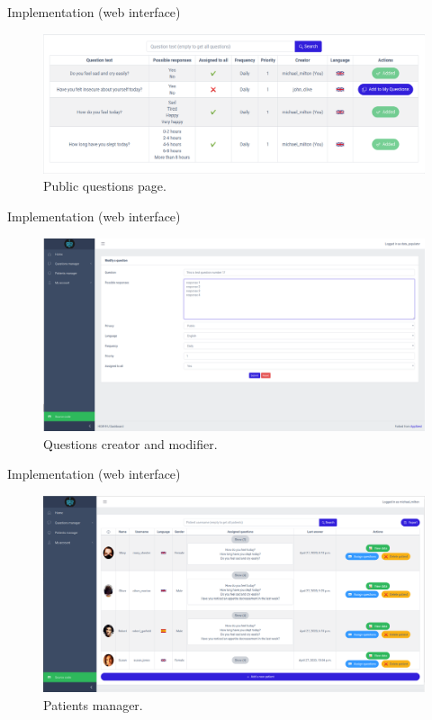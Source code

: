 \documentclass{beamer}
\begin{document}
\begin{frame}[fragile]{Implementation (web interface)}
  \begin{figure}[H]
      \centering
      \includegraphics[width=\textwidth]{public_questions.png}
      \caption{Public questions page.}
  \end{figure}
\end{frame}
\begin{frame}[fragile]{Implementation (web interface)}
  \begin{figure}[H]
    \centering
      \includegraphics[width=\textwidth]{questions_modifier.png}
    \caption{Questions creator and modifier.}
  \end{figure}
\end{frame}
\begin{frame}[fragile]{Implementation (web interface)}
  \begin{figure}[H]
    \centering
      \includegraphics[width=\textwidth]{patients_manager.png}
    \caption{Patients manager.}
  \end{figure}
\end{frame}
\end{document}
